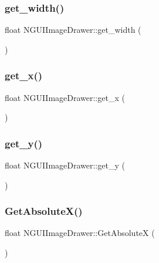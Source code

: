 \subsubsection{\texorpdfstring{get\+\_\+width()}{get\_width()}}
{\footnotesize\ttfamily float N\+G\+U\+I\+Image\+Drawer\+::get\+\_\+width (\begin{DoxyParamCaption}{ }\end{DoxyParamCaption})}

\hypertarget{class_n_g_u_i_image_drawer_a1d3bc28f8af13e1b5d0113b481378702}{}\label{class_n_g_u_i_image_drawer_a1d3bc28f8af13e1b5d0113b481378702} 
\subsubsection{\texorpdfstring{get\+\_\+x()}{get\_x()}}
{\footnotesize\ttfamily float N\+G\+U\+I\+Image\+Drawer\+::get\+\_\+x (\begin{DoxyParamCaption}{ }\end{DoxyParamCaption})}

\hypertarget{class_n_g_u_i_image_drawer_ae7f462a5ea5c7fcc82608de87832783b}{}\label{class_n_g_u_i_image_drawer_ae7f462a5ea5c7fcc82608de87832783b} 
\subsubsection{\texorpdfstring{get\+\_\+y()}{get\_y()}}
{\footnotesize\ttfamily float N\+G\+U\+I\+Image\+Drawer\+::get\+\_\+y (\begin{DoxyParamCaption}{ }\end{DoxyParamCaption})}

\hypertarget{class_n_g_u_i_image_drawer_accd59637d5057b838fe127aad590daf6}{}\label{class_n_g_u_i_image_drawer_accd59637d5057b838fe127aad590daf6} 
\subsubsection{\texorpdfstring{Get\+Absolute\+X()}{GetAbsoluteX()}}
{\footnotesize\ttfamily float N\+G\+U\+I\+Image\+Drawer\+::\+Get\+AbsoluteX (\begin{DoxyParamCaption}{ }\end{DoxyParamCaption})}


